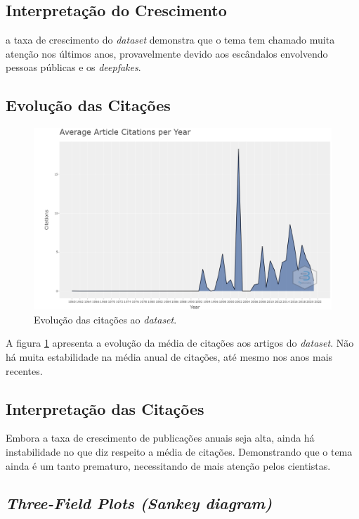 \subsection{Interpretação do Crescimento} a taxa de crescimento do \textit{dataset} demonstra que o tema tem chamado muita atenção nos últimos anos, provavelmente devido aos escândalos envolvendo pessoas públicas e os \textit{deepfakes}.

\subsection{Evolução das Citações}

\begin{figure}
    \centering
    \includegraphics[angle=0,width=1\textwidth]{experiments/titofrota/PesquisaBibliometrica/Deepfakes/citations-year-plot.png}
    \caption{Evolução das citações ao \textit{dataset}.}
    \label{fig:evol:anual:citacoes:DEEPFAKES@titofrota}
\end{figure}

A figura \ref{fig:evol:anual:citacoes:DEEPFAKES@titofrota} apresenta a evolução da média de citações aos artigos do \textit{dataset}. Não há muita estabilidade na média anual de citações, até mesmo nos anos mais recentes.

\subsection{Interpretação das Citações}
Embora a taxa de crescimento de publicações anuais seja alta, ainda há instabilidade no que diz respeito a média de citações. Demonstrando que o tema ainda é um tanto prematuro, necessitando de mais atenção pelos cientistas.

\subsection{\textit{Three-Field Plots (Sankey diagram)}}

